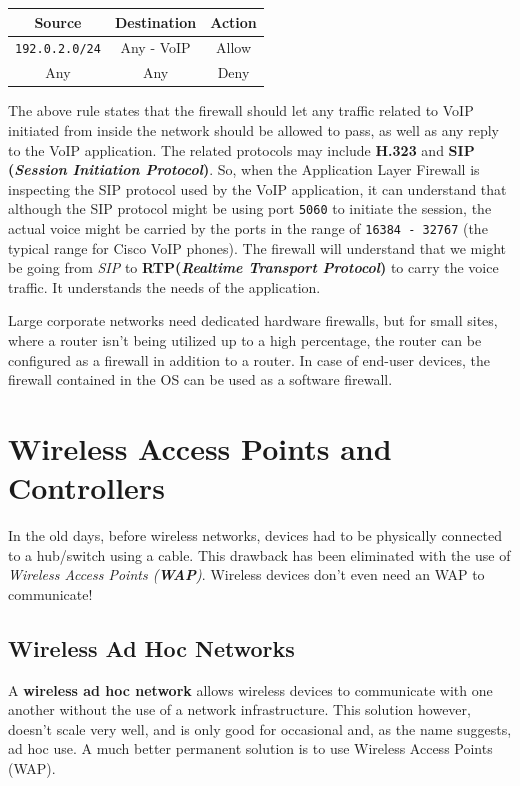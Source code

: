 \vspace{-10pt}
\begin{center}
	\begin{tabular}{ccc}
		\toprule
		\textbf{Source} &\textbf{Destination} &\textbf{Action} \\
		\midrule
		\verb|192.0.2.0/24| &Any - VoIP &Allow \\
		Any &Any &Deny \\
		\bottomrule	
	\end{tabular}
\end{center}
\vspace{-10pt}

\noindent
The above rule states that the firewall should let any traffic related to VoIP initiated from inside the network should be allowed to pass, as well as any reply to the VoIP application. The related protocols may include \textbf{H.323} and \textbf{SIP (\textit{Session Initiation Protocol})}. So, when the Application Layer Firewall is inspecting the SIP protocol used by the VoIP application, it can understand that although the SIP protocol might be using port \verb|5060| to initiate the session, the actual voice might be carried by the ports in the range of \verb|16384 - 32767| (the typical range for Cisco VoIP phones). The firewall will understand that we might be going from \textit{SIP} to \textbf{RTP(\textit{Realtime Transport Protocol})} to carry the voice traffic. It understands the needs of the application. 

Large corporate networks need dedicated hardware firewalls, but for small sites, where a router isn't being utilized up to a high percentage, the router can be configured as a firewall in addition to a router. In case of end-user devices, the firewall contained in the OS can be used as a software firewall. 

\section{Wireless Access Points and Controllers}
In the old days, before wireless networks, devices had to be physically connected to a hub/switch using a cable. This drawback has been eliminated with the use of \textit{Wireless Access Points (\textbf{WAP})}. Wireless devices don't even need an WAP to communicate!

\subsection{Wireless Ad Hoc Networks}
A \textbf{wireless ad hoc network} allows wireless devices to communicate with one another without the use of a network infrastructure. This solution however, doesn't scale very well, and is only good for occasional and, as the name suggests, ad hoc use. A much better permanent solution is to use Wireless Access Points (WAP). 

